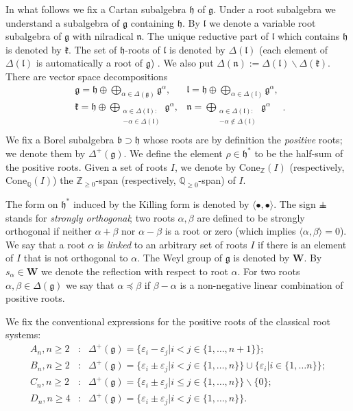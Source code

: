 \documentclass[12pt]{report}
\newcommand{\WW}{\mathbf{W}}
\newcommand {\ZZ} {\mathbb {Z}}
\newcommand {\QQ} {\mathbb {Q}}
\newcommand{\kk}{\mathfrak{k}}
\newcommand{\nn}{\mathfrak{n}}
\newcommand{\hh}{\mathfrak{h}}
\newcommand{\gG}{\mathfrak{g}}
\newcommand{\bb}{\mathfrak{b}}
\newcommand{\lL}{\mathfrak{l}}
\newcommand{\Cone}{\mathrm{Cone}}
\newcommand{\eps}{\varepsilon}
\def\sperp{{\hbox{$\perp${\hbox{\kern -.77em $-$}\raise-1pt\hbox{\kern -.77em $-$}}\ }}}
\newcommand{\pma}{\pm}%
\begin{document}
In what follows we fix a Cartan subalgebra $\hh$ of $\gG$. Under a root subalgebra we understand a subalgebra of $\gG$ containing $\hh$. By $\lL$ we denote a variable root subalgebra of $\gG$ with nilradical $\nn$. The unique reductive part of $\lL$ which contains $\hh$ is denoted by $\kk$. The set of $\hh$-roots of $\lL$ is denoted by $\Delta(\lL)$ (each element of $\Delta(\lL)$ is automatically a root of $\gG$) . We also put $\Delta(\nn):=\Delta(\lL)\backslash \Delta(\kk)$. There are vector space decompositions 
\[
\begin{array}{cc}
\displaystyle\gG=\hh\oplus\bigoplus_{\alpha\in\Delta(\gG)}\gG^\alpha,& \displaystyle\lL=\hh\oplus\bigoplus_{\alpha \in \Delta(\lL)} \gG^{\alpha},\\
\displaystyle \kk=\hh\oplus\bigoplus_{\substack{ \alpha\in\Delta(\lL) :\\-\alpha \in\Delta(\lL)}}\gG^\alpha,&\displaystyle\nn=\bigoplus_{ \substack{\alpha\in \Delta(\lL) :\\ -\alpha \notin \Delta(\lL)}}\gG^{\alpha}\\
\end{array}.
\]
We fix a Borel subalgebra $\bb\supset\hh$ whose roots are by definition the \emph{positive} roots; we denote them by $\Delta^+(\gG)$. We define the element $\rho\in\hh^*$ to be the half-sum of the positive roots. Given a set of roots $I$, we denote by $\Cone_{\ZZ}(I)$ (respectively, $\Cone_{\QQ}(I)$) the $\ZZ_{\geq 0}$-span (respectively, $\QQ_{\geq 0}$-span) of $I$.

The form on $\hh^*$ induced by the Killing form is denoted by $\langle\bullet,\bullet\rangle$. The sign $\sperp$ stands for \emph{strongly orthogonal}; two roots $\alpha,\beta$ are defined to be strongly orthogonal if neither $\alpha+\beta$ nor $\alpha-\beta$ is a root or zero (which implies $\langle\alpha,\beta\rangle=0$).  We say that a root $\alpha$ is \emph{linked} to an arbitrary set of roots $I$ if there is an element of $I$ that is not orthogonal to $\alpha$. The Weyl group of $\gG$ is denoted by $\WW$. By $s_\alpha\in\WW$ we denote the reflection with respect to root $\alpha$. For two roots $\alpha,\beta\in\Delta(\gG)$ we say that $\alpha\preceq\beta$ if $\beta-\alpha$ is a non-negative linear combination of positive roots. 



We fix the conventional expressions for the positive roots of the classical root systems:
\begin{eqnarray*}
A_n, n\geq 2&:& \Delta^+(\gG)=\{\eps_i-\eps_j|i< j\in\{1,\dots,n+1\}\};\\
B_n, n\geq 2&:& \Delta^+(\gG)=\{\eps_i\pma\eps_j|i< j\in\{1,\dots,n\}\}\cup\{\eps_i|i\in\{1,\dots n\}\};\\
C_n, n\geq 2&:& \Delta^+(\gG)=\{\eps_i\pma\eps_j|i\leq j\in\{1,\dots,n\}\}\backslash\{0\};\\
D_n, n\geq 4&:& \Delta^+(\gG)=\{\eps_i\pma\eps_j|i< j\in\{1,\dots,n\}\}.
\end{eqnarray*}
\end{document}
